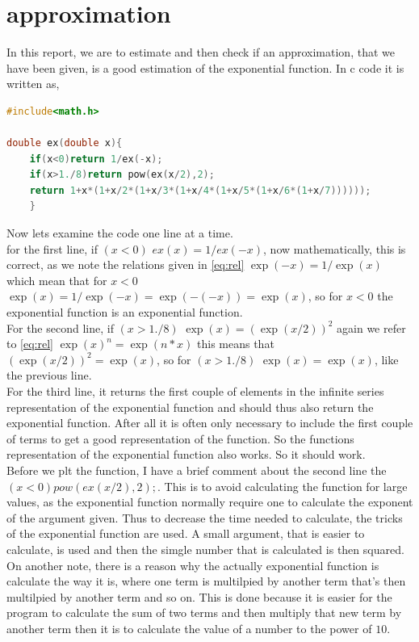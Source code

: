 \documentclass{article}
\begin{document}
\section{approximation}
In this report, we are to estimate and then check if an approximation, that we have been given, is a good estimation of the exponential function. In c code it is written as, 
\begin{lstlisting}[language=C]
#include<math.h>

double ex(double x){
	if(x<0)return 1/ex(-x);
	if(x>1./8)return pow(ex(x/2),2);
	return 1+x*(1+x/2*(1+x/3*(1+x/4*(1+x/5*(1+x/6*(1+x/7))))));
	}
\end{lstlisting}
Now lets examine the code one line at a time.\\
for the first line, if $(x<0)$ $ex(x)=1/ex(-x)$, now mathematically, this is correct, as we note the relations given in \ref{eq:rel} $\exp(-x)=1/\exp(x)$ which mean that for $x<0$ $\exp(x)=1/\exp(-x)= \exp(-(-x))=\exp(x)$, so for $x<0$ the exponential function is an exponential function. \\
For the second line,  if $(x>1./8)$ $\exp(x) = (\exp(x/2))^2$ again we refer to \ref{eq:rel} $\exp(x)^n=\exp(n*x)$ this means that $(\exp(x/2))^2=\exp(x)$, so for $(x>1./8)$ $\exp(x)=\exp(x)$, like the previous line.\\
For the third line, it returns the first couple of elements in the infinite series representation of the exponential function and should thus also return the exponential function. After all it is often only necessary to include the first couple of terms to get a good representation of the function. So the functions representation of the exponential function also works. So it should work.\\
%
Before we plt the function, I have a brief comment about the second line the $(x<0) pow(ex(x/2),2);$. This is to avoid calculating the function for large values, as the exponential function normally require one to calculate the exponent of the argument given. Thus to decrease the time needed to calculate, the tricks of the exponential function are used. A small argument, that is easier to calculate, is used and then the simgle number that is calculated is then squared. \\
On another note, there is a reason why the actually exponential function is calculate the way it is, where one term is multilpied by another term that's then multilpied by another term and so on. This is done because it is easier for the program to calculate the sum of two terms and then multiply that new term by another term then it is to calculate the value of a number to the power of $10$.\\
\end{document}
